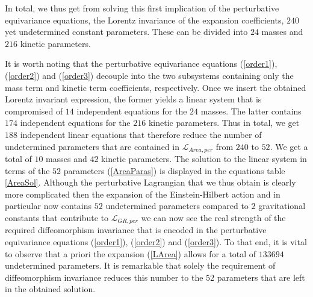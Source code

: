 In total, we thus get from solving this first implication of the perturbative equivariance equations, the Lorentz invariance of the expansion coefficients, $240$ yet undetermined constant parameters. These can be divided into $24$ masses and $216$ kinetic parameters.

It is worth noting that the perturbative equivariance equations (\ref{order1}), (\ref{order2}) and (\ref{order3}) decouple into the two subsystems containing only the mass term and kinetic term coefficients, respectively. Once we insert the obtained Lorentz invariant expression, the former yields a linear system that is compromised of $14$ independent equations for the $24$ masses. The latter contains $174$ independent equations for the $216$ kinetic parameters. Thus in total, we get $188$ independent linear equations that therefore reduce the number of undetermined parameters that are contained in $\mathcal{L}_{Area,per}$ from $240$ to $52$. We get a total of $10$ masses and $42$ kinetic parameters. The solution to the linear system in terms of the $52$ parameters (\ref{AreaParas}) is displayed in the equations table \ref{AreaSol}. Although the perturbative Lagrangian that we thus obtain is clearly more complicated then the expansion of the Einstein-Hilbert action and in particular now contains $52$ undetermined parameters compared to $2$ gravitational constants that contribute to $\mathcal{L}_{GR,per}$ we can now see the real strength of the required diffeomorphism invariance that is encoded in the perturbative equivariance equations (\ref{order1}), (\ref{order2}) and (\ref{order3}). To that end, it is vital to observe that a priori the expansion (\ref{LArea}) allows for a total of $133694$ undetermined parameters. It is remarkable that solely the requirement of diffeomorphism invariance reduces this number to the $52$ parameters that are left in the obtained solution. 

